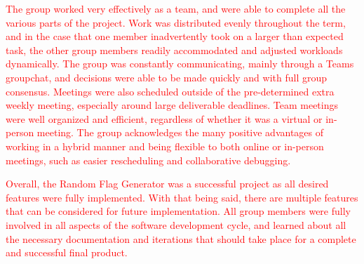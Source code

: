 \documentclass{article}
\begin{document}
\textcolor{red}{The group worked very effectively as a team, and were able to complete all the various parts of the project. Work was distributed evenly throughout the term, and in the case that one
member inadvertently took on a larger than expected task, the other group members readily accommodated and adjusted workloads dynamically.
The group was constantly communicating, mainly through a Teams groupchat, and decisions were able to be made quickly and with full group consensus.
Meetings were also scheduled outside of the pre-determined extra weekly meeting, especially around large deliverable deadlines. Team meetings were
well organized and efficient, regardless of whether it was a virtual or in-person meeting. The group acknowledges the many positive advantages of working in a hybrid manner
and being flexible to both online or in-person meetings, such as easier rescheduling and collaborative debugging.}

\textcolor{red}{Overall, the Random Flag Generator was a successful project as all desired features were fully implemented. With that being said, 
there are multiple features that can be considered for future implementation. All group members were fully involved in all aspects of the software development cycle, and learned
about all the necessary documentation and iterations that should take place for a complete and successful final product.}
\end{document}
